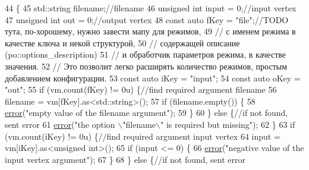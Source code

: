\begin{DoxyCode}
44                                                                                  \{
45             std::string filename;\textcolor{comment}{//filename}
46             \textcolor{keywordtype}{unsigned} \textcolor{keywordtype}{int} input = 0;\textcolor{comment}{//input vertex}
47             \textcolor{keywordtype}{unsigned} \textcolor{keywordtype}{int} out = 0;\textcolor{comment}{//output vertex}
48             \textcolor{keyword}{const} \textcolor{keyword}{auto} fKey = \textcolor{stringliteral}{"file"};\textcolor{comment}{//TODO тута, по-хорошему, нужно завести мапу для режимов,}
49             \textcolor{comment}{// с именем режима в качестве ключа и  некой структурой,}
50             \textcolor{comment}{// содержащей описание (po::options\_description)}
51             \textcolor{comment}{// и обработчик параметров режима, в качестве значения.}
52             \textcolor{comment}{// Это позволит легко расширять количество режимов, простым добавлением конфигурации.}
53             \textcolor{keyword}{const} \textcolor{keyword}{auto} iKey = \textcolor{stringliteral}{"input"};
54             \textcolor{keyword}{const} \textcolor{keyword}{auto} oKey = \textcolor{stringliteral}{"out"};
55             \textcolor{keywordflow}{if} (vm.count(fKey) != 0u) \{\textcolor{comment}{//find required argument filename}
56                 filename = vm[fKey].as<std::string>();
57                 \textcolor{keywordflow}{if} (filename.empty()) \{
58                     \hyperlink{a00002_a87a2f3f5782023b4ed03aedc00094c01_a87a2f3f5782023b4ed03aedc00094c01}{error}(\textcolor{stringliteral}{"empty value of the filename argument"});
59                 \}
60             \} \textcolor{keywordflow}{else} \{\textcolor{comment}{//if not found, sent error}
61                 \hyperlink{a00002_a87a2f3f5782023b4ed03aedc00094c01_a87a2f3f5782023b4ed03aedc00094c01}{error}(\textcolor{stringliteral}{"the option \(\backslash\)"filename\(\backslash\)" is required but missing"});
62             \}
63             \textcolor{keywordflow}{if} (vm.count(iKey) != 0u) \{\textcolor{comment}{//find required argument input vertex}
64                 input = vm[iKey].as<\textcolor{keywordtype}{unsigned} \textcolor{keywordtype}{int}>();
65                 \textcolor{keywordflow}{if} (input <= 0) \{
66                     \hyperlink{a00002_a87a2f3f5782023b4ed03aedc00094c01_a87a2f3f5782023b4ed03aedc00094c01}{error}(\textcolor{stringliteral}{"negative value of the input vertex argument"});
67                 \}
68             \} \textcolor{keywordflow}{else} \{\textcolor{comment}{//if not found, sent error}

\end{DoxyCode}
